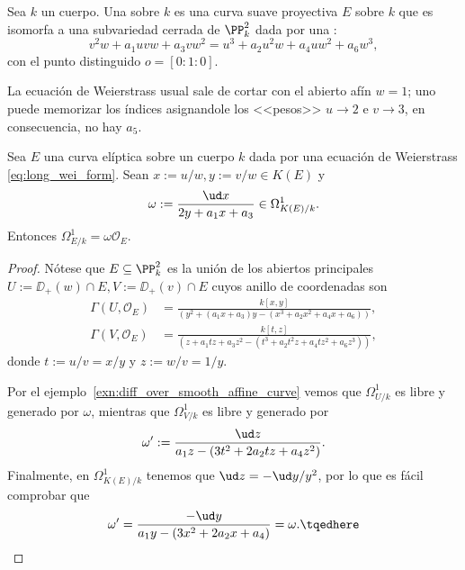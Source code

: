 \begin{mydefi}
	Sea $k$ un cuerpo.
	Una  sobre $k$ es una curva suave proyectiva $E$ sobre $k$ que es isomorfa a una subvariedad
	cerrada de $\PP^2_k$ dada por una :
	\begin{equation}
		v^2w + a_1uvw + a_3vw^2 = u^3 + a_2u^2w + a_4uw^2 + a_6w^3,
		\label{eq:long_wei_form}
	\end{equation}
	con el punto distinguido $o = [0 : 1 : 0]$.
\end{mydefi}
La ecuación de Weierstrass usual sale de cortar con el abierto afín $w = 1$;
uno puede memorizar los índices asignandole los <<pesos>> $u \to 2$ e $v \to 3$, en consecuencia, no hay $a_5$.
\begin{prop}
	Sea $E$ una curva elíptica sobre un cuerpo $k$ dada por una ecuación de Weierstrass \eqref{eq:long_wei_form}.
	Sean $x := u/w, y := v/w \in K(E)$ y
	$$ \omega := \frac{\ud x}{2y + a_1x + a_3} \in \Omega_{K(E)/k}^1. $$
	Entonces $\Omega_{E/k}^1 = \omega \mathscr{O}_E$.
\end{prop}
\begin{proof}
	Nótese que $E \subseteq \PP^2_k$ es la unión de los abiertos principales $U := \DD_+(w) \cap E, V := \DD_+(v) \cap E$ cuyos anillo de coordenadas son
	\begin{align*}
		\Gamma(U, \mathscr{O}_E) &= \frac{k[x, y]}{( y^2 + (a_1x + a_3)y - (x^3 + a_2x^2 + a_4x + a_6) )}, \\
		\Gamma(V, \mathscr{O}_E) &= \frac{k[t, z]}{( z + a_1tz + a_3z^2 - (t^3 + a_2t^2z + a_4tz^2 + a_6z^3) )},
	\end{align*}
	donde $t := u/v = x/y$ y $z := w/v = 1/y$.

	Por el ejemplo~\ref{exn:diff_over_smooth_affine_curve} vemos que $\Omega_{U/k}^1$ es libre y generado por $\omega$,
	mientras que $\Omega_{V/k}^1$ es libre y generado por
	$$ \omega' := \frac{\ud z}{a_1z - (3t^2 + 2a_2tz + a_4z^2)}. $$
	Finalmente, en $\Omega_{K(E)/k}^1$ tenemos que $\ud z = -\ud y/y^2$, por lo que es fácil comprobar que
	\begin{equation}
		\omega' = \frac{-\ud y}{a_1y - (3x^2 + 2a_2x + a_4)} = \omega.
		\tqedhere
	\end{equation}
\end{proof}

